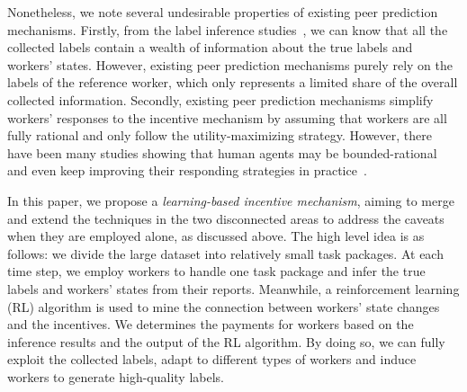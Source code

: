 Nonetheless, we note several undesirable properties of existing peer prediction mechanisms.
Firstly, from the label inference studies~\cite{zheng2017truth}, we can know that all the collected labels contain a wealth of information about the true labels and workers' states.
However, existing peer prediction mechanisms purely rely on the labels of the reference worker, which only represents a limited share of the overall collected information.
Secondly, existing peer prediction mechanisms simplify workers' responses to the incentive mechanism by assuming that workers are all fully rational and only follow the utility-maximizing strategy.
However, there have been many studies showing that human agents may be bounded-rational and even keep improving their responding strategies in practice~\cite{simon1982models,mckelvey1995quantal,chastain2014algorithms}.




In this paper, we propose a \emph{learning-based incentive mechanism}, aiming to merge and extend the techniques in the two disconnected areas to address the caveats when they are employed alone, as discussed above.
The high level idea is as follows: we divide the large dataset into relatively small task packages. At each time step, we employ workers to handle one task package and infer the true labels and workers' states from their reports.
Meanwhile, a reinforcement learning (RL) algorithm is used to mine the connection between workers' state changes and the incentives.
We determines the payments for workers based on the inference results and the output of the RL algorithm.
By doing so, we can fully exploit the collected labels, adapt to different types of workers and induce workers to generate high-quality labels.




